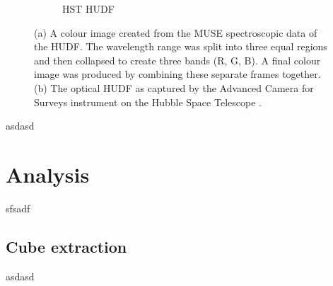 \documentclass[12pt, twocolumn]{revtex4}    %
\begin{document}
\begin{figure}
\begin{subfigure}[b]{0.4\textwidth}
    \captionsetup{justification=justified}    
    \caption{HST HUDF}
    \label{fig:hubble_ultra_deep_field}
  \end{subfigure}
  \caption[Hubble Ultra Deep Field]{(a) A colour image created from the MUSE spectroscopic data of the HUDF. The wavelength range was split into three equal regions and then collapsed to create three bands (R, G, B). A final colour image was produced by combining these separate frames together. (b) The optical HUDF as captured by the Advanced Camera for Surveys instrument on the Hubble Space Telescope \cite{hudf_image}. }
\end{figure}

\twocolumngrid

asdasd

\section{Analysis} 

sfsadf

\subsection{Cube extraction}

asdasd

\onecolumngrid
\end{document}
